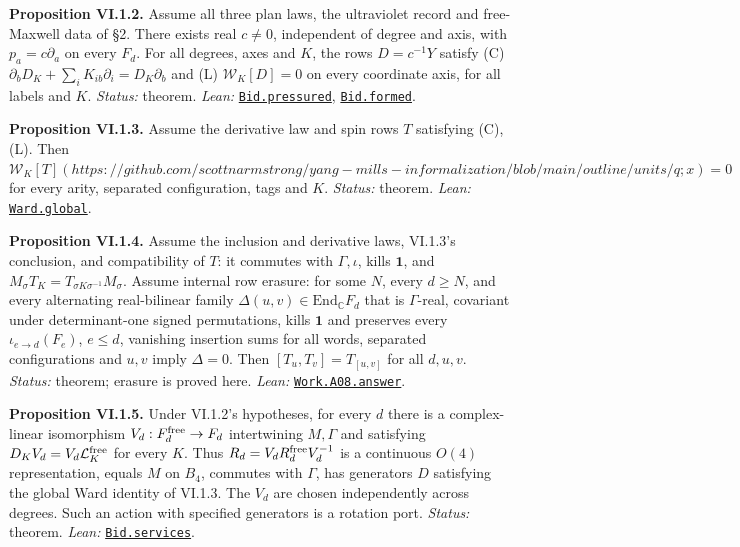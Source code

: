 \documentclass[
  letterpaper,
  11pt]{article}
\begin{document}
\textbf{Proposition VI.1.2.} Assume all three plan laws, the ultraviolet
record and free-Maxwell data of §2. There exists real \(c\ne0\),
independent of degree and axis, with \(p_a=c\partial_a\) on every
\(F_d\). For all degrees, axes and \(K\), the rows \(D=c^{-1}Y\) satisfy
(C) \(\partial_bD_K+\sum_iK_{ib}\partial_i=D_K\partial_b\) and (L)
\(\mathcal W_K[D]=0\) on every coordinate axis, for all labels and
\(K\). \emph{Status:} theorem. \emph{Lean:}
\href{https://github.com/yang-mills-group/OpenAI-YM-20261028/blob/3456e5e75cf8d4cd558955a5c7638fba2d68f464/YM/Bid/Town.lean\#L49-L59}{\texttt{Bid.pressured}},
\href{https://github.com/yang-mills-group/OpenAI-YM-20261028/blob/3456e5e75cf8d4cd558955a5c7638fba2d68f464/YM/Bid/Town.lean\#L61-L78}{\texttt{Bid.formed}}.

\textbf{Proposition VI.1.3.} Assume the derivative law and spin rows
\(T\) satisfying (C),(L). Then
\(\mathcal W_K[T](https://github.com/scottnarmstrong/yang-mills-informalization/blob/main/outline/units/q;x)=0\)
for every arity, separated configuration, tags and \(K\). \emph{Status:}
theorem. \emph{Lean:}
\href{https://github.com/yang-mills-group/OpenAI-YM-20261028/blob/3456e5e75cf8d4cd558955a5c7638fba2d68f464/YM/Ward/Axis.lean\#L130-L139}{\texttt{Ward.global}}.

\textbf{Proposition VI.1.4.} Assume the inclusion and derivative laws,
VI.1.3's conclusion, and compatibility of \(T\): it commutes with
\(\Gamma,\iota\), kills \(\mathbf1\), and
\(M_\sigma T_K=T_{\sigma K\sigma^{-1}}M_\sigma\). Assume internal row
erasure: for some \(N\), every \(d\ge N\), and every alternating
real-bilinear family \(\Delta(u,v)\in\mathrm{End}_{\mathbb C}F_d\) that
is \(\Gamma\)-real, covariant under determinant-one signed permutations,
kills \(\mathbf1\) and preserves every \(\iota_{e\to d}(F_e)\),
\(e\le d\), vanishing insertion sums for all words, separated
configurations and \(u,v\) imply \(\Delta=0\). Then
\([T_u,T_v]=T_{[u,v]}\) for all \(d,u,v\). \emph{Status:} theorem;
erasure is proved here. \emph{Lean:}
\href{https://github.com/yang-mills-group/OpenAI-YM-20261028/blob/3456e5e75cf8d4cd558955a5c7638fba2d68f464/YM/Work/A08.lean\#L232-L247}{\texttt{Work.A08.answer}}.

\textbf{Proposition VI.1.5.} Under VI.1.2's hypotheses, for every \(d\)
there is a complex-linear isomorphism \(V_d:F_d^{\rm free}\to F_d\)
intertwining \(M,\Gamma\) and satisfying
\(D_KV_d=V_d\mathcal L_K^{\rm free}\) for every \(K\). Thus
\(R_d=V_dR_d^{\rm free}V_d^{-1}\) is a continuous \(O(4)\)
representation, equals \(M\) on \(B_4\), commutes with \(\Gamma\), has
generators \(D\) satisfying the global Ward identity of VI.1.3. The
\(V_d\) are chosen independently across degrees. Such an action with
specified generators is a rotation port. \emph{Status:} theorem.
\emph{Lean:}
\href{https://github.com/yang-mills-group/OpenAI-YM-20261028/blob/3456e5e75cf8d4cd558955a5c7638fba2d68f464/YM/Bid/Town.lean\#L124-L157}{\texttt{Bid.services}}.
\end{document}

